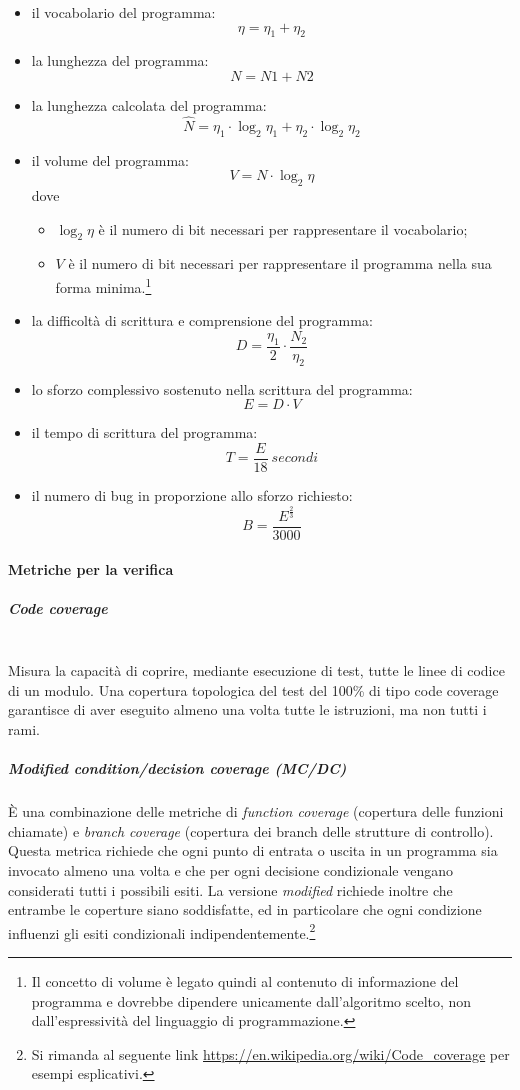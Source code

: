 \begin{itemize}
	\item il vocabolario del programma:
		\[ \eta = \eta_{1} + \eta_{2} \]
	\item la lunghezza del programma:
		\[ N = N1 + N2 \]
	\item la lunghezza calcolata del programma: 
		\[ {\hat {N}}=\eta_{1} \cdot \log_{2}\eta_{1}+\eta_{2} \cdot \log_{2}\eta_{2} \]
	\item il volume del programma:
		\[ V = N \cdot \log_{2}\eta \] 
		dove
		\begin{itemize}
			\item $ \log_{2}\eta $ è il numero di bit necessari per rappresentare il vocabolario;
			\item $ V $ è il numero di bit necessari per rappresentare il programma nella sua forma minima.\footnote{Il concetto di volume è legato quindi al contenuto di informazione del programma e dovrebbe dipendere unicamente dall'algoritmo scelto, non dall'espressività del linguaggio di programmazione.}
		\end{itemize}
	\item la difficoltà di scrittura e comprensione del programma:
		\[ D = \frac{\eta_{1}}{2} \cdot \frac{N_{2}}{\eta_{2}} \]
	\item lo sforzo complessivo sostenuto nella scrittura del programma:
		\[ E = D \cdot V \]
	\item il tempo di scrittura del programma:
		\[ T=\frac{E}{18}\ secondi\]
	\item il numero di bug in proporzione allo sforzo richiesto:
		\[ B = \frac{E^{\frac{2}{3}}}{3000} \]	
\end{itemize}

\paragraph{Metriche per la verifica}\mbox{}
\subparagraph{Code coverage}\mbox{}\\
Misura la capacità di coprire, mediante esecuzione di test, tutte le linee di codice di un modulo. Una copertura topologica del test del 100\% di tipo code coverage garantisce di aver eseguito almeno una volta tutte le istruzioni, ma non tutti i rami.

\subparagraph{Modified condition/decision coverage (MC/DC)}
\`{E} una combinazione delle metriche di \textit{function coverage} (copertura delle funzioni chiamate) e \textit{branch coverage} (copertura dei branch delle strutture di controllo). Questa metrica richiede che ogni punto di entrata o uscita in un programma sia invocato almeno una volta e che per ogni decisione condizionale vengano considerati tutti i possibili esiti. La versione \textit{modified} richiede inoltre che entrambe le coperture siano soddisfatte, ed in particolare che ogni condizione influenzi gli esiti condizionali indipendentemente.\footnote{Si rimanda al seguente link \url{https://en.wikipedia.org/wiki/Code_coverage} per esempi esplicativi.}

